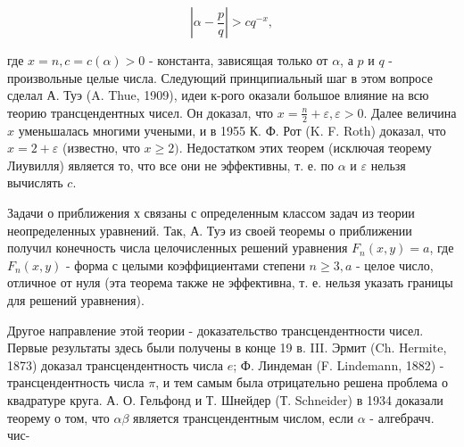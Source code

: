 \documentclass[10pt]{article}
\begin{document}
\[

\left|\alpha-\frac{p}{q}\right|>c q^{-x},

\]



где $x=n, c=c(\alpha)>0$ - константа, зависящая только от $\alpha$, а $p$ и $q$ - произвольные целые числа. Следующий принципиальный шаг в этом вопросе сделал А. Туэ (A. Thue, 1909), идеи к-рого оказали большое влияние на всю теорию трансцендентных чисел. Он доказал, что $x=\frac{n}{2}+\varepsilon, \varepsilon>0$. Далее величина $x$ уменьшалась многими учеными, и в 1955 К. Ф. Рот (K. F. Roth) доказал, что $x=2+\varepsilon$ (известно, что $x \geqslant 2)$. Недостатком этих теорем (исключая теорему Лиувилля) является то, что все они не эффективны, т. е. по $\alpha$ и $\varepsilon$ нельзя вычислять $c$.



Задачи о приближения х связаны с определенным классом задач из теории неопределенных уравнений. Так, А. Туэ из своей теоремы о приближении получил конечность числа целочисленных решений уравнения $F_{n}(x, y)=a$, где $F_{n}(x, y)$ - форма с целыми коэффициентами степени $n \geqslant 3, a$ - целое число, отличное от нуля (эта теорема также не эффективна, т. е. нельзя указать границы для решений уравнения).



Другое направление этой теории - доказательство трансцендентности чисел. Первые результаты здесь были получены в конце 19 в. III. Эрмит (Ch. Hermite, 1873) доказал трансцендентность числа $e$; Ф. Линдеман (F. Lindemann, 1882) - трансцендентность числа $\pi$, и тем самым была отрицательно решена проблема о квадратуре круга. А. О. Гельфонд и Т. Шнейдер (Т. Schneider) в 1934 доказали теорему $о$ том, что $\alpha \beta$ является трансцендентным числом, если $\alpha$ - алгебрачч. чис-
\end{document}
